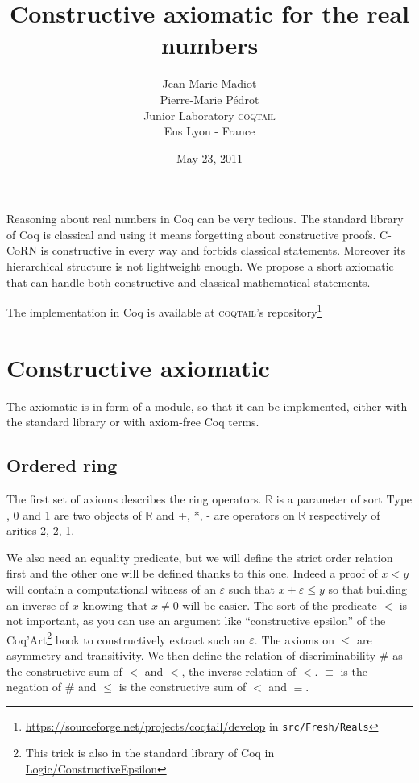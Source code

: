 \documentclass[a4paper,11pt]{article}
\newcommand{\R}{\mathbb{R}}
\newcommand{\Type}{\mbox{Type}}
\newcommand{\coqtail}{\textsc{coqtail}}
\theoremstyle{definition}
\theoremstyle{remark}
\begin{document}
\title{Constructive axiomatic for the real numbers}
\author{
Jean-Marie Madiot\\
Pierre-Marie Pédrot\\
Junior Laboratory \coqtail{}\\
Ens Lyon - France\\}
\date{May 23, 2011}

\maketitle 

  Reasoning about real numbers in Coq can be very tedious. The standard library of Coq is classical and using it means forgetting about constructive proofs. C-CoRN is constructive in every way and forbids classical statements. Moreover its hierarchical structure is not lightweight enough. We propose a short axiomatic that can handle both constructive and classical mathematical statements.
  
  The implementation in Coq is available at \coqtail's repository\footnote{\url{https://sourceforge.net/projects/coqtail/develop} in {\tt src/Fresh/Reals}}

\section{Constructive axiomatic}

The axiomatic is in form of a module, so that it can be implemented, either with the standard library or with axiom-free Coq terms.

\subsection{Ordered ring}

The first set of axioms describes the ring operators. $\R$ is a parameter of sort $\Type$, 0 and 1 are two objects of $\R$ and +, *, - are operators on $\R$ respectively of arities 2, 2, 1.

We also need an equality predicate, but we will define the strict order relation first and the other one will be defined thanks to this one. Indeed a proof of $x<y$ will contain a computational witness of an $\varepsilon$ such that $x+\varepsilon≤y$ so that building an inverse of $x$ knowing that $x\neq 0$ will be easier. The sort of the predicate $<$ is not important, as you can use an argument like ``constructive epsilon'' of the Coq'Art\cite{coqart}\footnote{This trick is also in the standard library of Coq in \href{http://coq.inria.fr/stdlib/Coq.Logic.ConstructiveEpsilon.html}{Logic/ConstructiveEpsilon}} book to constructively extract such an $\varepsilon$. The axioms on $<$ are asymmetry and transitivity. We then define the relation of discriminability $\#$ as the constructive sum of $<$ and $<$, the inverse relation of $<$. $≡$ is the negation of $\#$ and $≤$ is the constructive sum of $<$ and $≡$.
\end{document}
